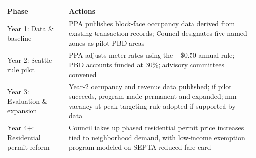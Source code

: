 \begin{tabularx}{\linewidth}{lX}
\toprule
\textbf{Phase} & \textbf{Actions} \\
\midrule
Year 1: Data \& baseline &
  PPA publishes block-face occupancy data derived from existing transaction records;
  Council designates five named zones as pilot PBD areas \\[4pt]
Year 2: Seattle-rule pilot &
  PPA adjusts meter rates using the \(\pm\$0.50\) annual rule;
  PBD accounts funded at 30\%; advisory committees convened \\[4pt]
Year 3: Evaluation \& expansion &
  Year-2 occupancy and revenue data published;
  if pilot succeeds, program made permanent and expanded;
  min-vacancy-at-peak targeting rule adopted if supported by data \\[4pt]
Year 4+: Residential permit reform &
  Council takes up phased residential permit price increases tied to neighborhood demand,
  with low-income exemption program modeled on SEPTA reduced-fare card \\
\bottomrule
\end{tabularx}

